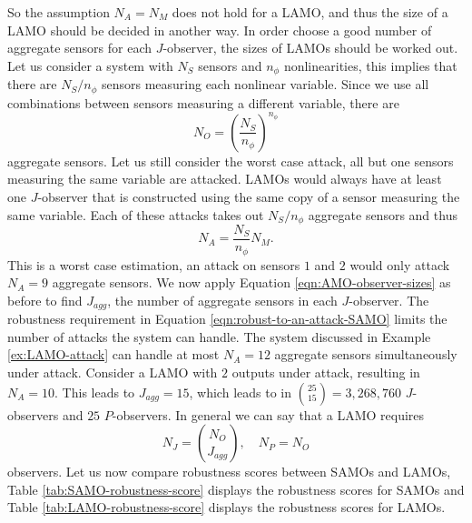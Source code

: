 So the assumption $N_A=N_M$ does not hold for a LAMO, and thus the size of a LAMO should be decided in another way. In order choose a good number of aggregate sensors for each $J$-observer, the sizes of LAMOs should be worked out. Let us consider a system with $N_S$ sensors and $n_{\phi}$ nonlinearities, this implies that there are $N_S/n_{\phi}$ sensors measuring each nonlinear variable. Since we use all combinations between sensors measuring a different variable, there are
\begin{equation}\label{eqn:num-N_O-LAMO}
    N_O = \left( \frac{N_S}{n_{\phi}} \right) ^{n_{\phi}}
\end{equation}
aggregate sensors. Let us still consider the worst case attack, all but one sensors measuring the same variable are attacked. LAMOs would always have at least one $J$-observer that is constructed using the same copy of a sensor measuring the same variable. Each of these attacks takes out $N_S/n_{\phi}$ aggregate sensors and thus
\begin{equation}\label{eqn:N_A-LAMO-MOs}
    N_A = \frac{N_S}{n_{\phi}} N_M.
\end{equation}
This is a worst case estimation, an attack on sensors $1$ and $2$ would only attack $N_A=9$ aggregate sensors. We now apply Equation \eqref{eqn:AMO-observer-sizes} as before to find $J_{agg}$, the number of aggregate sensors in each $J$-observer. The robustness requirement in Equation \eqref{eqn:robust-to-an-attack-SAMO} limits the number of attacks the system can handle. The system discussed in Example \ref{ex:LAMO-attack} can handle at most $N_A=12$ aggregate sensors simultaneously under attack. Consider a LAMO with $2$ outputs under attack, resulting in $N_A=10$. This leads to $J_{agg}=15$, which leads to in $\binom{25}{15}=3,268,760$ $J$-observers and $25$ $P$-observers. In general we can say that a LAMO requires
\begin{equation}
    N_J = \binom{N_O}{J_{agg}}, \quad N_P = N_O
\end{equation}
observers. Let us now compare robustness scores between SAMOs and LAMOs, Table \ref{tab:SAMO-robustness-score} displays the robustness scores for SAMOs and Table \ref{tab:LAMO-robustness-score} displays the robustness scores for LAMOs. 

